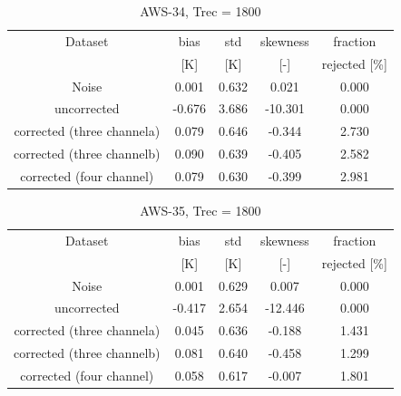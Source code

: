 \documentclass[12pt]{article}
\begin{document}
\begin{table}[!p]
	\centering
	\begin{tabular}[b]{c|c|c|c|c}
		Dataset  		  &   bias &   std &   skewness & fraction  \\
		&   [K]  &   [K] & [-] & rejected [\%]\\
		\hline
	Noise                      &  0.001 & 0.632 &              0.021 &      0.000 \\
	uncorrected                & -0.676 & 3.686 &            -10.301 &      0.000 \\
	corrected (three channela) &  0.079 & 0.646 &             -0.344 &      2.730 \\
    corrected (three channelb) &  0.090 & 0.639 &             -0.405 &      2.582 \\
	corrected (four channel)   &  0.079 & 0.630 &             -0.399 &      2.981 \\
		\hline
	\end{tabular}
	\caption{ AWS-34, Trec = 1800 }
	\label{tab:qrnn:C36}
\end{table}

\begin{table}[!p]
	\centering
	\begin{tabular}[b]{c|c|c|c|c}
		Dataset  		  &   bias &   std &   skewness & fraction  \\
		&   [K]  &   [K] & [-] & rejected [\%]\\
		\hline
Noise                       &  0.001 & 0.629 &              0.007 &      0.000 \\
uncorrected                 & -0.417 & 2.654 &            -12.446 &      0.000 \\
corrected (three channela)  &  0.045 & 0.636 &             -0.188 &      1.431 \\
corrected (three channelb)  &  0.081 & 0.640 &             -0.458 &      1.299 \\
corrected (four channel)    &  0.058 & 0.617 &             -0.007 &      1.801 \\
		\hline
	\end{tabular}
	\caption{ AWS-35, Trec = 1800 }
	\label{tab:qrnn:C36}
\end{table}
\end{document}
